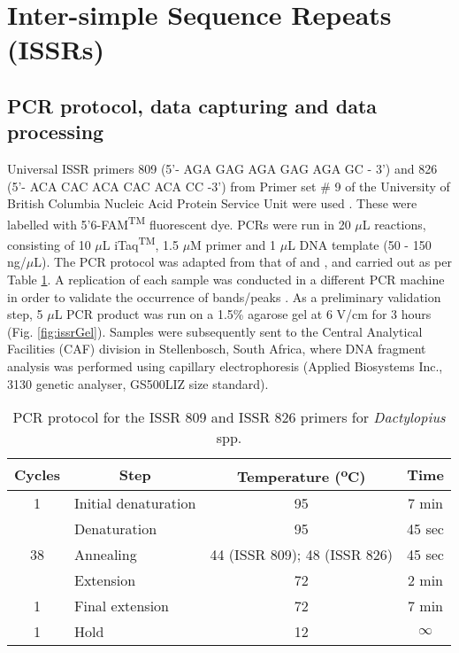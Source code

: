 \section{Inter-simple Sequence Repeats (ISSRs)}

\subsection{PCR protocol, data capturing and data processing}

Universal ISSR primers 809 (5'- AGA GAG AGA GAG AGA GC - 3') and 826 (5'- ACA CAC ACA CAC ACA CC -3') from Primer set \# 9 of the University of British Columbia Nucleic Acid Protein Service Unit  were used \citep{Abbot2001}. These were labelled with 5'6-FAM\textsuperscript{TM} fluorescent dye. PCRs were run in 20 $\mu$L reactions, consisting of 10 $\mu$L iTaq\textsuperscript{TM}, 1.5 $\mu$M primer and 1 $\mu$L DNA template (50 - 150 ng/$\mu$L). The PCR protocol was adapted from that of \citet{saha2011genetic} and \citet{silva2013genetic}, and carried out as per Table \ref{tab:PCRprotocol_ISSR}. 
A replication of each sample was conducted in a different PCR machine in order to validate the occurrence of bands/peaks \citep{Taylor2011GeneticMiridae, Sutton2017GeneticAgents}. As a preliminary validation step, 5 $\mu$L PCR product was run on a 1.5\% agarose gel at 6 V/cm for 3 hours (Fig. \ref{fig:issrGel}).
Samples were subsequently sent to the Central Analytical Facilities (CAF) division in Stellenbosch, South Africa, where DNA fragment analysis was performed using capillary electrophoresis (Applied Biosystems Inc., 3130 genetic analyser, GS500LIZ size standard).

\vspace{0.5cm}

\begin{table}[H]
\renewcommand{\arraystretch}{0.5}
	\centering
	\caption{PCR protocol for the ISSR 809 and ISSR 826 primers for \textit{Dactylopius} spp.}
	\label{tab:PCRprotocol_ISSR}
	\begin{tabular}{@{}clcc@{}}
		\toprule
		\textbf{Cycles} & \multicolumn{1}{c}{\textbf{Step}} & \textbf{Temperature (\textsuperscript{o}C)} & \textbf{Time} \\ \midrule
		1 & Initial denaturation & 95 & 7 min \\ \hline 
		\multirow{3}{*}{38} & Denaturation & 95 & 45 sec \\ 
		& Annealing & 44 (ISSR 809); 48 (ISSR 826) & 45 sec \\
		& Extension & 72 & 2 min \\ \hline 
		1 & Final extension & 72 & 7 min \\ \hline
		1 & Hold & 12 & $\infty$ \\ \bottomrule
	\end{tabular}
\end{table}

